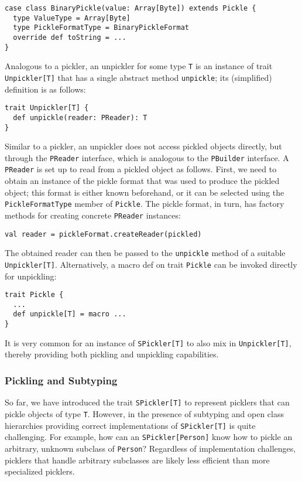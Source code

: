 \begin{lstlisting}
case class BinaryPickle(value: Array[Byte]) extends Pickle {
  type ValueType = Array[Byte]
  type PickleFormatType = BinaryPickleFormat
  override def toString = ...
}
\end{lstlisting}
\noindent


Analogous to a pickler, an unpickler for some type \verb|T| is an instance of
trait \verb|Unpickler[T]| that has a single abstract method \verb|unpickle|;
its (simplified) definition is as follows:

\begin{lstlisting}
trait Unpickler[T] {
  def unpickle(reader: PReader): T
}
\end{lstlisting}
\noindent

Similar to a pickler, an unpickler does not access pickled objects directly,
but through the \verb|PReader| interface, which is analogous to the
\verb|PBuilder| interface. A \verb|PReader| is set up to read from a pickled
object as follows. First, we need to obtain an instance of the pickle format
that was used to produce the pickled object; this format is either known
beforehand, or it can be selected using the \verb|PickleFormatType| member of
\verb|Pickle|. The pickle format, in turn, has factory methods for creating
concrete \verb|PReader| instances:

\begin{lstlisting}
val reader = pickleFormat.createReader(pickled)
\end{lstlisting}

The obtained reader can then be passed to the \verb|unpickle| method of a
suitable \verb|Unpickler[T]|. Alternatively, a macro def on trait
\verb|Pickle| can be invoked directly for unpickling:

\begin{lstlisting}
trait Pickle {
  ...
  def unpickle[T] = macro ...
}
\end{lstlisting}
\noindent
It is very common for an instance of \verb|SPickler[T]| to also mix in
\verb|Unpickler[T]|, thereby providing both pickling and unpickling
capabilities.


\subsubsection{Pickling and Subtyping}

So far, we have introduced the trait \verb|SPickler[T]| to represent picklers
that can pickle objects of type \verb|T|. However, in the presence of
subtyping and open class hierarchies providing correct implementations of
\verb|SPickler[T]| is quite challenging. For example, how can an
\verb|SPickler[Person]| know how to pickle an arbitrary, unknown subclass of
\verb|Person|? Regardless of implementation challenges, picklers that handle
arbitrary subclasses are likely less efficient than more specialized picklers.

